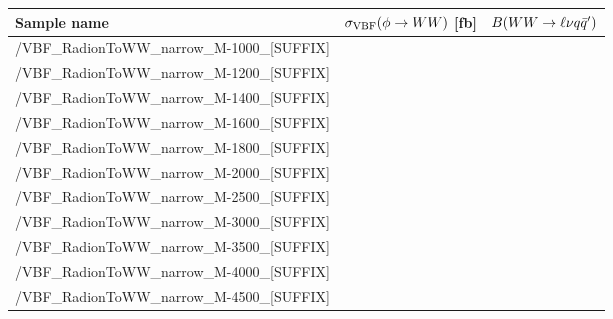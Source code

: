 \footnotesize
\begin{tabular}{lrr}
  \hline
  \textbf{Sample name} & $\sigma_{\mathrm{VBF}}(\phi\to WW)$ [fb] & $B(WW\to\ell\nu q\bar{q}')$ \\
  \hline
  \ttfamily/VBF\_RadionToWW\_narrow\_M-1000\_[SUFFIX] &   \\
  \ttfamily/VBF\_RadionToWW\_narrow\_M-1200\_[SUFFIX] &   \\
  \ttfamily/VBF\_RadionToWW\_narrow\_M-1400\_[SUFFIX] &   \\
  \ttfamily/VBF\_RadionToWW\_narrow\_M-1600\_[SUFFIX] &   \\
  \ttfamily/VBF\_RadionToWW\_narrow\_M-1800\_[SUFFIX] &   \\
  \ttfamily/VBF\_RadionToWW\_narrow\_M-2000\_[SUFFIX] &   \\
  \ttfamily/VBF\_RadionToWW\_narrow\_M-2500\_[SUFFIX] &   \\
  \ttfamily/VBF\_RadionToWW\_narrow\_M-3000\_[SUFFIX] &   \\
  \ttfamily/VBF\_RadionToWW\_narrow\_M-3500\_[SUFFIX] &   \\
  \ttfamily/VBF\_RadionToWW\_narrow\_M-4000\_[SUFFIX] &   \\
  \ttfamily/VBF\_RadionToWW\_narrow\_M-4500\_[SUFFIX] &   \\
  \hline
\end{tabular}
